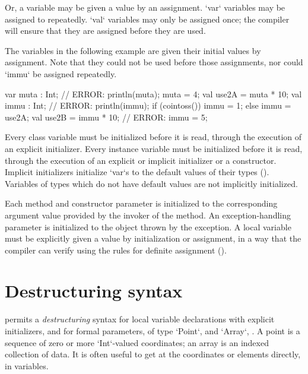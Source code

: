 Or, a variable may be given a value by an assignment.  \xcd`var` variables may
be assigned to repeatedly.  \xcd`val` variables may only be assigned once; the
compiler will ensure that they are assigned before they are used.

\begin{ex}
The variables in the following example are given their initial values by
assignment.  Note that they could not be used before those assignments,
nor could \xcd`immu` be assigned repeatedly.
\begin{xten}
  var muta : Int;
  // ERROR:  println(muta);
  muta = 4;
  val use2A = muta * 10;
  val immu : Int;
  // ERROR: println(immu);
  if (cointoss())   {immu = 1;}
  else              {immu = use2A;}
  val use2B = immu * 10;
  // ERROR: immu = 5;
\end{xten}
\end{ex}

Every class variable must be initialized before it is read, through
the execution of an explicit initializer. Every
instance variable must be initialized before it is read, through the
execution of an explicit or implicit initializer or a constructor.
Implicit initializers initialize \xcd`var`s to the default values of their
types (). Variables of types which do not have default
values are not implicitly initialized.



Each method and constructor parameter is initialized to the
corresponding argument value provided by the invoker of the method. An
exception-handling parameter is initialized to the object thrown by
the exception. A local variable must be explicitly given a value by
initialization or assignment, in a way that the compiler can verify
using the rules for definite assignment ().


\section{Destructuring syntax}
\Xten{} permits a \emph{destructuring} syntax for local variable
declarations with explicit initializers,  and for formal parameters, of type
\xcd`Point`,  and \xcd`Array`, .
A point is a sequence of zero or more \xcd`Int`-valued coordinates; an array
is an indexed collection of data. 
It is often useful to get at the coordinates or elements directly, in
variables.

